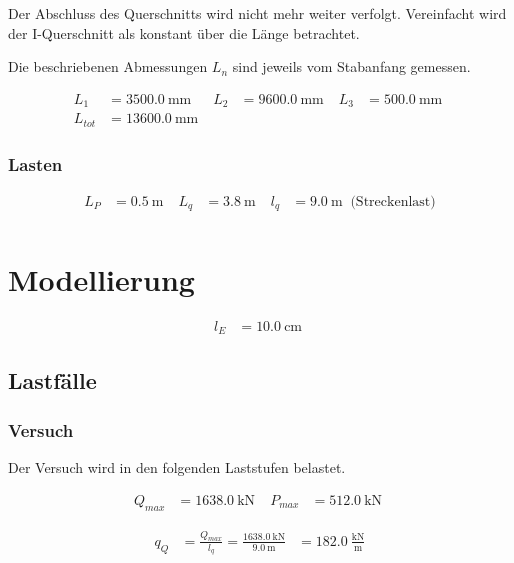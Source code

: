 \documentclass[
  11pt,
  letterpaper,
]{scrreprt}
\begin{document}
Der Abschluss des Querschnitts wird nicht mehr weiter verfolgt.
Vereinfacht wird der I-Querschnitt als konstant über die Länge
betrachtet.

Die beschriebenen Abmessungen \(L_n\) sind jeweils vom Stabanfang
gemessen.

$$
\begin{aligned}
L_{1} &= 3500.0\ \mathrm{mm} \; 
 &L_{2} &= 9600.0\ \mathrm{mm} \; 
 &L_{3} &= 500.0\ \mathrm{mm} \; 
\\[11pt]
 L_{tot} &= 13600.0\ \mathrm{mm} \;
\end{aligned}
$$

\subsubsection{Lasten}\label{lasten}

$$
\begin{aligned}
L_{P} &= 0.5\ \mathrm{m} \; 
 &L_{q} &= 3.8\ \mathrm{m} \; 
 &l_{q} &= 9.0\ \mathrm{m} \; \;\textrm{(Streckenlast)}
\\[11pt]
\end{aligned}
$$

\section{Modellierung}\label{modellierung}

$$
\begin{aligned}
l_{E} &= 10.0\ \mathrm{cm} \;
\end{aligned}
$$

\subsection{Lastfälle}\label{lastfuxe4lle}

\subsubsection{Versuch}\label{versuch}

Der Versuch wird in den folgenden Laststufen belastet.

$$
\begin{aligned}
Q_{max} &= 1638.0\ \mathrm{kN} \; 
 &P_{max} &= 512.0\ \mathrm{kN} \;
\end{aligned}
$$

$$
\begin{aligned}
q_{Q} &= \frac{ Q_{max} }{ l_{q} }  = \frac{ 1638.0\ \mathrm{kN} }{ 9.0\ \mathrm{m} } &= 182.0\ \frac{\mathrm{kN}}{\mathrm{m}}  
\end{aligned}
$$
\end{document}

